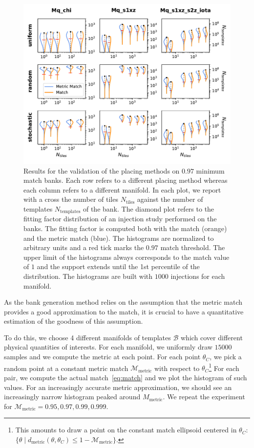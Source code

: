 \documentclass[twocolumn,showpacs,preprintnumbers,nofootinbib,prd,
superscriptaddress,10pt]{revtex4-2}
\begin{document}
\begin{figure}[th!]
	\centering
	\includegraphics[width=.85\textwidth,keepaspectratio]{placing_validation}
	\caption{Results for the validation of the placing methods on $0.97$ minimum match banks. Each row refers to a different placing method whereas each column refers to a different manifold. In each plot, we report with a cross the number of tiles $N_{\text{tiles}}$ against the number of templates $N_{\text{templates}}$ of the bank.
	The diamond plot refers to the fitting factor distribution of an injection study performed on the banks. The fitting factor is computed both with the match (orange) and the metric match (blue). The histograms are normalized to arbitrary units and a red tick marks the $0.97$ match threshold. The upper limit of the histograms always corresponds to the match value of $1$ and the support extends until the 1st percentile of the distribution.
	The histograms are built with $1000$ injections for each manifold.
	}
	\label{fig:placing_validation}
\end{figure}

As the bank generation method relies on the assumption that the metric match provides a good approximation to the match, it is crucial to have a quantitative estimation of the goodness of this assumption.

To do this, we choose 4 different manifolds of templates $\mathcal{B}$ which cover different physical quantities of interests. For each manifold, we uniformly draw $15000$ samples and we compute the metric at each point.
For each point $\theta_C$, we pick a random point at a constant metric match $\mathcal{M}_{\text{metric}}$ with respect to $\theta_C$\footnote{
This amounts to draw a point on the constant match ellipsoid centered in
$\theta_C$: $\{\theta \; | \; d_{\text{metric}}(\theta,\theta_C) \leq 1-\mathcal{M}_{\text{metric}} \}$.
}
For each pair, we compute the actual match~\eqref{eq:match} and we plot the histogram of such values. For an increasingly accurate metric approximation, we should see an increasingly narrow histogram peaked around $M_{\text{metric}}$.
We repeat the experiment for $\mathcal{M}_{\text{metric}} = 0.95, 0.97, 0.99, 0.999$.
\end{document}
